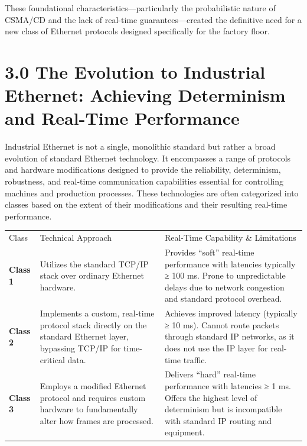 \documentclass[a4paper, 12pt]{book} %
\begin{document}
These foundational characteristics---particularly the probabilistic
nature of CSMA/CD and the lack of real-time guarantees---created the
definitive need for a new class of Ethernet protocols designed
specifically for the factory floor.

\section{3.0 The Evolution to Industrial Ethernet: Achieving Determinism
and Real-Time
Performance}\label{the-evolution-to-industrial-ethernet-achieving-determinism-and-real-time-performance}

Industrial Ethernet is not a single, monolithic standard but rather a
broad evolution of standard Ethernet technology. It encompasses a range
of protocols and hardware modifications designed to provide the
reliability, determinism, robustness, and real-time communication
capabilities essential for controlling machines and production
processes. These technologies are often categorized into classes based
on the extent of their modifications and their resulting real-time
performance.

\begin{longtable}[]{@{}
  >{\raggedright\arraybackslash}p{}
  >{\raggedright\arraybackslash}p{}
  >{\raggedright\arraybackslash}p{}@{}}
\toprule\noalign{}
\endhead
\bottomrule\noalign{}
\endlastfoot
Class & Technical Approach & Real-Time Capability \& Limitations \\
\textbf{Class 1} & Utilizes the standard TCP/IP stack over ordinary
Ethernet hardware. & Provides ``soft'' real-time performance with
latencies typically ≥ 100 ms. Prone to unpredictable delays due to
network congestion and standard protocol overhead. \\
\textbf{Class 2} & Implements a custom, real-time protocol stack
directly on the standard Ethernet layer, bypassing TCP/IP for
time-critical data. & Achieves improved latency (typically ≥ 10 ms).
Cannot route packets through standard IP networks, as it does not use
the IP layer for real-time traffic. \\
\textbf{Class 3} & Employs a modified Ethernet protocol and requires
custom hardware to fundamentally alter how frames are processed. &
Delivers ``hard'' real-time performance with latencies ≥ 1 ms. Offers
the highest level of determinism but is incompatible with standard IP
routing and equipment. \\
\end{longtable}
\end{document}
